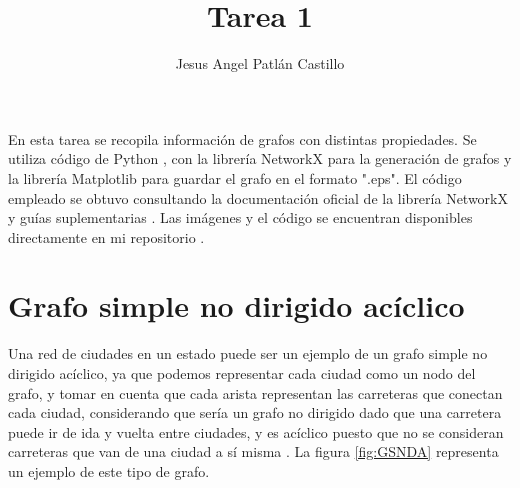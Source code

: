 \documentclass{article}
\title{Tarea 1}
\author{Jesus Angel Patlán Castillo }
\date{\displaydate{date}}
\begin{document}
 
 
\lstset{style=mystyle}


\maketitle

En esta tarea se recopila información de grafos con distintas propiedades. Se utiliza código de Python \cite{Python}, con la librería NetworkX \cite{NetworkX} para la generación de grafos y la librería Matplotlib \cite{Matplotlib} para guardar el grafo en el formato ".eps". El código empleado se obtuvo consultando la documentación oficial de la librería NetworkX \cite{NetworkXD} y guías suplementarias \cite{SOQ1} \cite{SOQ2}. Las imágenes y el código se encuentran disponibles directamente en mi repositorio \cite{JAPC}.


\section{Grafo simple no dirigido acíclico}
Una red de ciudades en un estado puede ser un ejemplo de un grafo simple no dirigido acíclico, ya que podemos representar cada ciudad como un nodo del grafo, y tomar en cuenta que cada arista representan las carreteras que conectan cada ciudad, considerando que sería un grafo no dirigido dado que una carretera puede ir de ida y vuelta entre ciudades, y es acíclico puesto que no se consideran carreteras que van de una ciudad a sí misma \cite{novo2004aplicaciones}. La figura \ref{fig:GSNDA} representa un ejemplo de este tipo de grafo.
\end{document}
